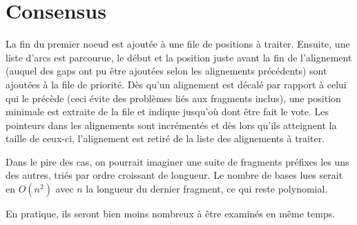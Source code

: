 \section{Consensus}

La fin du premier noeud est ajoutée à une file de positions à traiter.
Ensuite, une liste d'arcs est parcourue,
le début et la position juste avant la fin de l'alignement (auquel des gaps ont
pu être ajoutées selon les alignements précédents) sont ajoutées
à la file de priorité. Dès qu'un alignement est décalé par rapport à celui qui
le précède (ceci évite des problèmes liés aux fragments inclus),
une position minimale est extraite de la file et indique jusqu'où
dont être fait le vote. Les pointeurs dans les alignements sont incrémentés et
dès lors qu'ils atteignent la taille de ceux-ci, l'alignement est retiré de
la liste des alignements à traiter.

Dans le pire des cas, on pourrait imaginer une suite de fragments préfixes les
uns des autres, triés par ordre croissant de longueur. Le nombre de bases lues
serait en $O(n^2)$ avec $n$ la longueur du dernier fragment,
ce qui reste polynomial.

En pratique, ils seront bien moins nombreux à être examinés en même temps.
